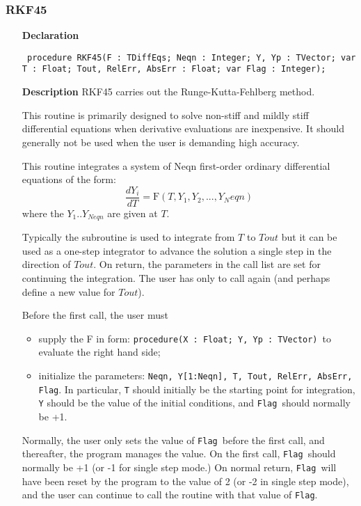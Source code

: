 \documentclass[12pt,a4paper,oneside]{report}
\newcommand{\declarationitem}[1]{\textbf{#1}}
\newcommand{\descriptiontitle}[1]{\textbf{#1}}
\newcommand{\code}[1]{\texttt{#1}}
\begin{document}
\subsubsection{RKF45}
\label{urkf-RKF45}
\begin{itemize}\item[\declarationitem{Declaration}\hfill]
	\begin{flushleft}
		\code{
			procedure RKF45(F : TDiffEqs; Neqn : Integer; Y, Yp : TVector; var T : Float; Tout, RelErr, AbsErr : Float; var Flag : Integer);}
	\end{flushleft}
	\item[\descriptiontitle{Description}]
	RKF45 carries out the Runge-Kutta-Fehlberg method.
	
	This routine is primarily designed to solve non-stiff and mildly stiff
	differential equations when derivative evaluations are inexpensive.
	It should generally not be used when the user is demanding
	high accuracy.
	
	This routine integrates a system of Neqn first-order ordinary
	differential equations of the form:
	$$\frac{dY_i}{dT} = \textrm{F}(T,Y_1,Y_2,...,Y_Neqn)$$
	where the $Y_1..Y_{Neqn}$ are given at $T$.
	
	Typically the subroutine is used to integrate from $T$ to $T{out}$ but it
	can be used as a one-step integrator to advance the solution a
	single step in the direction of $T{out}$.  On return, the parameters in
	the call list are set for continuing the integration.  The user has
	only to call again (and perhaps define a new value for $T{out}$).
	
	Before the first call, the user must
	\begin{itemize}
		\item supply the F in form: \code{procedure(X : Float; Y, Yp : TVector)}\ to evaluate the right hand side;
		\item initialize the parameters:
		\code{Neqn, Y[1:Neqn], T, Tout, RelErr, AbsErr, Flag}.
		In particular, \code{T} should initially be the starting point for integration,
		\code{Y} should be the value of the initial conditions, and \code{Flag}\ should
		normally be +1.
	\end{itemize}
	
	Normally, the user only sets the value of \code{Flag}\ before the first call, and
	thereafter, the program manages the value.  On the first call, \code{Flag}\ should
	normally be +1 (or -1 for single step mode.)  On normal return, \code{Flag}\ will
	have been reset by the program to the value of 2 (or -2 in single
	step mode), and the user can continue to call the routine with that
	value of \code{Flag}.
	

\end{itemize}
\end{document}
